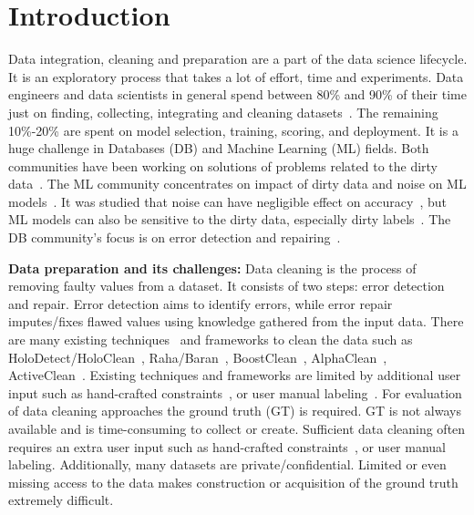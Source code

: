 \chapter{Introduction}
Data integration, cleaning and preparation are a part of the data science lifecycle. It is an exploratory process that takes a lot of effort, time and experiments.
Data engineers and data scientists in general spend between 80\% and 90\% of their time just on finding, collecting, integrating and cleaning datasets~\cite{80cleansurvey, dataintegration80}. The remaining 10\%-20\% are spent on model selection, training, scoring, and deployment.
It is a huge challenge in Databases (DB) and Machine Learning (ML) fields.
Both communities have been working on solutions of problems related to the dirty data~\cite{cleanml}. 
The ML community concentrates on impact of dirty data and noise on ML models~\cite{cleanml}.
It was studied that noise can have negligible effect on accuracy~\cite{processingsys, outperformstudy}, but ML models can also be sensitive to the dirty data, especially dirty labels~\cite{classificationnoisesurvey}.
The DB community's focus is on error detection and repairing~\cite{Hellerstein08quantitativedata, duplicatesstudy}.

\textbf{Data preparation and its challenges:}
Data cleaning is the process of removing faulty values from a dataset.
It consists of two steps: error detection and repair.
Error detection aims to identify errors, while error repair imputes/fixes flawed values using knowledge gathered from the input data. 
There are many existing techniques~\cite{duplicatesstudy, tdeexcel} and frameworks to clean the data such as HoloDetect/HoloClean~\cite{holodetect, RekatsinasCIR2017}, Raha/Baran~\cite{raha, baran}, BoostClean~\cite{boostclean}, AlphaClean~\cite{alphaclean}, ActiveClean~\cite{activeclean}. 
Existing techniques and frameworks are limited by additional user input such as hand-crafted constraints~\cite{bart}, or user manual labeling~\cite{raha, baran}.
For evaluation of data cleaning approaches the ground truth (GT) is required.
GT is not always available and is time-consuming to collect or create.
Sufficient data cleaning often requires an extra user input such as hand-crafted constraints~\cite{bart}, or user manual labeling.
Additionally, many datasets are private/confidential. 
Limited or even missing access to the data makes construction or acquisition of the ground truth extremely difficult. 


